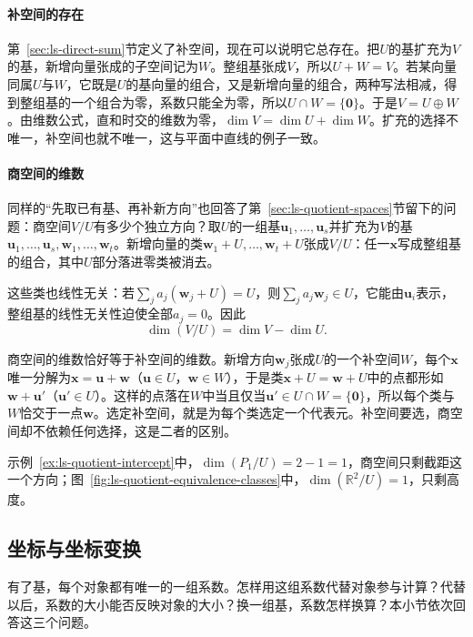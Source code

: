 \paragraph{补空间的存在}
第~\ref{sec:ls-direct-sum}节定义了补空间，现在可以说明它总存在。把$U$的基扩充为$V$的基，新增向量张成的子空间记为$W$。整组基张成$V$，所以$U+W=V$。若某向量同属$U$与$W$，它既是$U$的基向量的组合，又是新增向量的组合，两种写法相减，得到整组基的一个组合为零，系数只能全为零，所以$U\cap W=\{\bm0\}$。于是$V=U\oplus W$。由维数公式，直和时交的维数为零，$\dim V=\dim U+\dim W$。扩充的选择不唯一，补空间也就不唯一，这与平面中直线的例子一致。

\paragraph{商空间的维数}
同样的“先取已有基、再补新方向”也回答了第~\ref{sec:ls-quotient-spaces}节留下的问题：商空间$V/U$有多少个独立方向？取$U$的一组基$\bm u_1,\ldots,\bm u_s$并扩充为$V$的基$\bm u_1,\ldots,\bm u_s,\bm w_1,\ldots,\bm w_t$。新增向量的类$\bm w_1+U,\ldots,\bm w_t+U$张成$V/U$：任一$\bm x$写成整组基的组合，其中$U$部分落进零类被消去。

这些类也线性无关：若$\sum_ja_j(\bm w_j+U)=U$，则$\sum_ja_j\bm w_j\in U$，它能由$\bm u_i$表示，整组基的线性无关性迫使全部$a_j=0$。因此
\begin{equation}
 \dim(V/U)=\dim V-\dim U.
 \label{eq:ls-quotient-dimension}
\end{equation}

商空间的维数恰好等于补空间的维数。新增方向$\bm w_j$张成$U$的一个补空间$W$，每个$\bm x$唯一分解为$\bm x=\bm u+\bm w$（$\bm u\in U$，$\bm w\in W$），于是类$\bm x+U=\bm w+U$中的点都形如$\bm w+\bm u'$（$\bm u'\in U$）。这样的点落在$W$中当且仅当$\bm u'\in U\cap W=\{\bm0\}$，所以每个类与$W$恰交于一点$\bm w$。选定补空间，就是为每个类选定一个代表元。补空间要选，商空间却不依赖任何选择，这是二者的区别。

示例~\ref{ex:ls-quotient-intercept}中，$\dim(P_1/U)=2-1=1$，商空间只剩截距这一个方向；图~\ref{fig:ls-quotient-equivalence-classes}中，$\dim(\mathbb R^2/U)=1$，只剩高度。

\subsection{坐标与坐标变换}
\label{sec:ls-coordinates}
\label{sec:linear-algebra-coordinates}

有了基，每个对象都有唯一的一组系数。怎样用这组系数代替对象参与计算？代替以后，系数的大小能否反映对象的大小？换一组基，系数怎样换算？本小节依次回答这三个问题。

